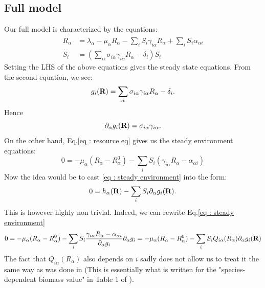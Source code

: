 \documentclass[12pt, titlepage]{report}
\begin{document}
		\subsection{Full model}
		Our full model is characterized by the equations:
		\begin{align}
			\dot{R_\alpha} &= \lambda_\alpha-\mu_\alpha R_\alpha - \sum_i S_i \gamma_{i\alpha} R_\alpha + \sum_i S_i \alpha_{\alpha i} \label{eq : resource eq}\\
			\dot{S_i} & = \left( \sum_\alpha \sigma_{i\alpha} \gamma_{i\alpha} R_\alpha -\delta_i \right) S_i
		\end{align}
		Setting the LHS of the above equations gives the steady state equations. From the second equation, we see:
		\begin{equation}
			g_i(\textbf{R}) = \sum_{\alpha} \sigma_{i\alpha} \gamma_{i\alpha} R_\alpha - \delta_i.
		\end{equation}
		Hence
		\begin{equation}
			\partial_\alpha g_i(\textbf{R}) = \sigma_{i\alpha} \gamma_{i\alpha}.
		\end{equation}
		On the other hand, Eq.\eqref{eq : resource eq} gives us the steady environment equations:
		\begin{equation}
			0 = -\mu_\alpha (R_\alpha - R_\alpha^0)- \sum_i S_i (\gamma_{i\alpha}R_\alpha-\alpha_{\alpha i}) \label{eq : steady environment}
		\end{equation}
		Now the idea would be to cast \eqref{eq : steady environment} into the form:
		\begin{equation}
			0 = h_\alpha(\textbf{R})- \sum_i S_i \partial_\alpha g_i(\textbf{R}).
		\end{equation}
		This is however highly non trivial. Indeed, we can rewrite Eq.\eqref{eq : steady environment}
		\begin{equation}
			0 = -\mu_\alpha (R_\alpha - R_\alpha^0)-\sum_i S_i \frac{\gamma_{i\alpha}R_\alpha-\alpha_{\alpha i}}{\partial_\alpha g_i} \partial_\alpha g_i = - \mu_\alpha(R_\alpha- R_\alpha^0) - \sum_i S_i Q_{i \alpha}(R_\alpha)\partial_\alpha g_i (\textbf{R})
		\end{equation}
		The fact that $Q_{i\alpha}(R_\alpha)$ also depends on $i$ sadly does not allow us to treat it the same way as was done in \cite{PankajNiche} (This is essentially what is written for the "species-dependent biomass value" in Table 1 of \cite{PankajNiche}).
\end{document}
